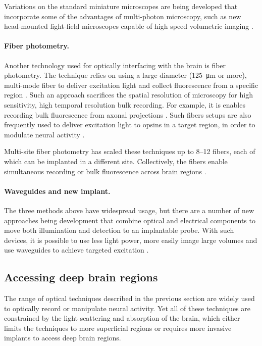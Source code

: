 Variations on the standard miniature microscopes are being 
developed that incorporate some of the advantages of multi-photon
microscopy, such as new head-mounted light-field microscopes 
capable of high speed volumetric imaging \cite{Skocek:2018hs}.

\paragraph{Fiber photometry.} Another technology used 
for optically interfacing with the brain is fiber photometry. 
The technique relies on using a large diameter 
(125~\si{\micro\meter} or more), multi-mode fiber to 
deliver excitation light and collect fluorescence from a 
specific region 
\cite{Adelsberger:2005dy,Cui:2013dq,Adelsberger:2014jd}.
Such an approach sacrifices the spatial resolution of 
microscopy for high sensitivity, high temporal resolution 
bulk recording. For example, it is enables recording bulk 
fluorescence from axonal projections \cite{Gunaydin:2014dh}. 
Such fibers setups are also frequently used to deliver 
excitation light to opsins in a target region, in order
to modulate neural activity \cite{Warden:2014bx}.

Multi-site fiber photometry has scaled these techniques up to 
8--12 fibers, each of which can be implanted in a different site.
Collectively, the fibers enable simultaneous recording or bulk 
fluorescence across brain regions \cite{Guo:2015gu}.

\paragraph{Waveguides and new implant.} The three methods 
above have widespread usage, but there are a number of new 
approaches being development that combine optical and electrical 
components to move both illumination and detection to an implantable probe.
With such devices, it is possible to use less light power, 
more easily image large volumes and use waveguides to achieve 
targeted excitation \cite{Warden:2014bx,Wu:2015gk,Segev:2017en}.

\subsection{Accessing deep brain regions}

The range of optical techniques described in the previous 
section are widely used to optically record or manipulate 
neural activity. Yet all of these techniques are constrained 
by the light scattering and absorption of the brain, which 
either limits the techniques to more superficial regions or 
requires more invasive implants to access deep brain regions.

